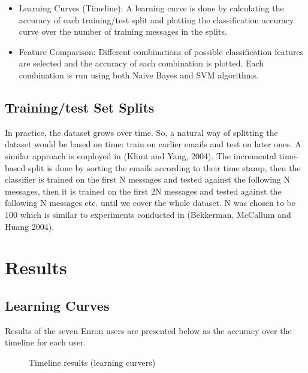 \begin{itemize}
\item Learning Curves (Timeline): A learning curve is done by calculating the accuracy of each training/test split and plotting the classification accuracy curve over the number of training messages in the splits. 

\item Feature Comparison: Different combinations of possible classification features are selected and the accuracy of each combination is plotted. Each combination is run using both Naive Bayes and SVM algorithms.
\end{itemize}

\subsection{Training/test Set Splits}
In practice, the dataset grows over time. So, a natural way of splitting the dataset would be based on time: train on earlier emails and test on later ones. A similar approach is employed in (Klimt and Yang, 2004)\cite{KY04}. 
The incremental time-based split is done by sorting the emails according to their time stamp, then the classifier is trained on the first N messages and tested against the following N messages, then it is trained on the first 2N messages and tested against the following N messages etc. until we cover the whole dataset. N was chosen to be 100 which is similar to experiments conducted in (Bekkerman, McCallum and Huang 2004)\cite{RON04}.

\section{Results}

\subsection{Learning Curves}
Results of the seven Enron users are presented below as the accuracy over the timeline for each user.

\begin{figure}[H]
    \begin{center}
    \end{center}
    \caption{Timeline results (learning curvers)}
\end{figure}

